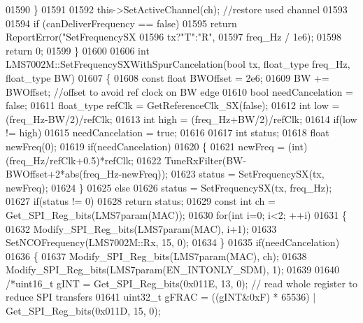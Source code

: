 \begin{DoxyCode}
{{{{{{{{{{{{{{{{{{{{{{{{{{{{{{{{{{{{{{{{{{{{{{{{01590     \}
01591 
01592     this->SetActiveChannel(ch); \textcolor{comment}{//restore used channel}
01593 
01594     \textcolor{keywordflow}{if} (canDeliverFrequency == \textcolor{keyword}{false})
01595         \textcolor{keywordflow}{return} ReportError(\textcolor{stringliteral}{"SetFrequencySX%
01596                             tx?\textcolor{stringliteral}{"T"}:\textcolor{stringliteral}{"R"},
01597                             freq\_Hz / 1e6);
01598     \textcolor{keywordflow}{return} 0;
01599 \}
01600 
01606 \textcolor{keywordtype}{int} LMS7002M::SetFrequencySXWithSpurCancelation(\textcolor{keywordtype}{bool} tx, float_type freq\_Hz, 
      float_type BW)
01607 \{
01608     \textcolor{keyword}{const} \textcolor{keywordtype}{float} BWOffset = 2e6;
01609     BW += BWOffset; \textcolor{comment}{//offset to avoid ref clock on BW edge}
01610     \textcolor{keywordtype}{bool} needCancelation = \textcolor{keyword}{false};
01611     float_type refClk = GetReferenceClk_SX(\textcolor{keyword}{false});
01612     \textcolor{keywordtype}{int} low = (freq\_Hz-BW/2)/refClk;
01613     \textcolor{keywordtype}{int} high = (freq\_Hz+BW/2)/refClk;
01614     \textcolor{keywordflow}{if}(low != high)
01615         needCancelation = \textcolor{keyword}{true};
01616 
01617     \textcolor{keywordtype}{int} status;
01618     \textcolor{keywordtype}{float} newFreq(0);
01619     \textcolor{keywordflow}{if}(needCancelation)
01620     \{
01621         newFreq = (int)(freq\_Hz/refClk+0.5)*refClk;
01622         TuneRxFilter(BW-BWOffset+2*abs(freq\_Hz-newFreq));
01623         status = SetFrequencySX(tx, newFreq);
01624     \}
01625     \textcolor{keywordflow}{else}
01626         status = SetFrequencySX(tx, freq\_Hz);
01627     \textcolor{keywordflow}{if}(status != 0)
01628         \textcolor{keywordflow}{return} status;
01629     \textcolor{keyword}{const} \textcolor{keywordtype}{int} ch = Get_SPI_Reg_bits(LMS7param(MAC));
01630     \textcolor{keywordflow}{for}(\textcolor{keywordtype}{int} i=0; i<2; ++i)
01631     \{
01632         Modify_SPI_Reg_bits(LMS7param(MAC), i+1);
01633         SetNCOFrequency(LMS7002M::Rx, 15, 0);
01634     \}
01635     \textcolor{keywordflow}{if}(needCancelation)
01636     \{
01637         Modify_SPI_Reg_bits(LMS7param(MAC), ch);
01638         Modify_SPI_Reg_bits(LMS7param(EN_INTONLY_SDM), 1);
01639 
01640         \textcolor{comment}{/*uint16\_t gINT = Get\_SPI\_Reg\_bits(0x011E, 13, 0);  // read whole register to reduce SPI transfers}
01641 \textcolor{comment}{        uint32\_t gFRAC = ((gINT&0xF) * 65536) | Get\_SPI\_Reg\_bits(0x011D, 15, 0);}
}}}}}}}}}}}}}}}}}}}}}}}}}}}}}}}}}}}}}}}}}}}}}}}}}
\end{DoxyCode}
